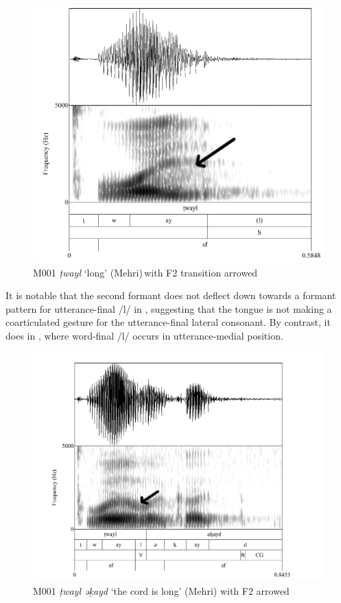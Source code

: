 \documentclass[output=paper]{langscibook}
\begin{document}
\begin{figure}[p]
\includegraphics[height=.4\textheight]{figures/a12Watsonetal-img001mod.png}
\caption{
 \label{fig:watson:1} M001 \textit{ṭwayl} ‘long’ (Mehri) with F2 transition arrowed}
\end{figure}


It is notable that the second formant does not deflect down towards a formant pattern for utterance-final \mbox{/l/} in , suggesting that the tongue is not making a coarticulated gesture for the utterance-final lateral consonant. By contrast, it does in , where word-final \mbox{/l/} occurs in utterance-medial position.

\begin{figure}[p]
\includegraphics[height=.4\textheight]{figures/a12Watsonetal-img002mod.png}
\caption{
 \label{fig:watson:2} M001 \textit{ṭwayl əḳayd} ‘the cord is long’ (Mehri) with F2 arrowed}
\end{figure}
\end{document}
